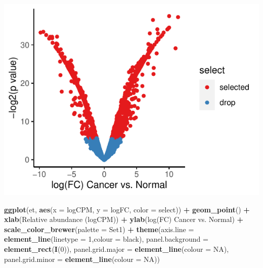 \documentclass[
]{article}
\newenvironment{Shaded}{\begin{snugshade}}{\end{snugshade}}
\newcommand{\AttributeTok}[1]{\textcolor[rgb]{0.13,0.29,0.53}{#1}}
\newcommand{\ConstantTok}[1]{\textcolor[rgb]{0.56,0.35,0.01}{#1}}
\newcommand{\DecValTok}[1]{\textcolor[rgb]{0.00,0.00,0.81}{#1}}
\newcommand{\FunctionTok}[1]{\textcolor[rgb]{0.13,0.29,0.53}{\textbf{#1}}}
\newcommand{\NormalTok}[1]{#1}
\newcommand{\SpecialCharTok}[1]{\textcolor[rgb]{0.81,0.36,0.00}{\textbf{#1}}}
\newcommand{\StringTok}[1]{\textcolor[rgb]{0.31,0.60,0.02}{#1}}
\begin{document}
\includegraphics{workshop_files/figure-latex/unnamed-chunk-52-1.pdf}

\begin{Shaded}
\begin{Highlighting}[]

\FunctionTok{ggplot}\NormalTok{(et, }\FunctionTok{aes}\NormalTok{(}\AttributeTok{x =}\NormalTok{ logCPM, }\AttributeTok{y =}\NormalTok{ logFC, }\AttributeTok{color =}\NormalTok{ select)) }\SpecialCharTok{+} \FunctionTok{geom\_point}\NormalTok{() }\SpecialCharTok{+}
  \FunctionTok{xlab}\NormalTok{(}\StringTok{\textquotesingle{}Relative abundance (logCPM)\textquotesingle{}}\NormalTok{) }\SpecialCharTok{+} \FunctionTok{ylab}\NormalTok{(}\StringTok{\textquotesingle{}log(FC) Cancer vs. Normal\textquotesingle{}}\NormalTok{) }\SpecialCharTok{+} 
  \FunctionTok{scale\_color\_brewer}\NormalTok{(}\AttributeTok{palette =} \StringTok{\textquotesingle{}Set1\textquotesingle{}}\NormalTok{) }\SpecialCharTok{+}
  \FunctionTok{theme}\NormalTok{(}\AttributeTok{axis.line =} \FunctionTok{element\_line}\NormalTok{(}\AttributeTok{linetype =} \DecValTok{1}\NormalTok{,}\AttributeTok{colour =} \StringTok{\textquotesingle{}black\textquotesingle{}}\NormalTok{),}
        \AttributeTok{panel.background =} \FunctionTok{element\_rect}\NormalTok{(}\FunctionTok{I}\NormalTok{(}\DecValTok{0}\NormalTok{)),}
        \AttributeTok{panel.grid.major =} \FunctionTok{element\_line}\NormalTok{(}\AttributeTok{colour =} \ConstantTok{NA}\NormalTok{),}
        \AttributeTok{panel.grid.minor =} \FunctionTok{element\_line}\NormalTok{(}\AttributeTok{colour =} \ConstantTok{NA}\NormalTok{))}
\end{Highlighting}
\end{Shaded}
\end{document}
